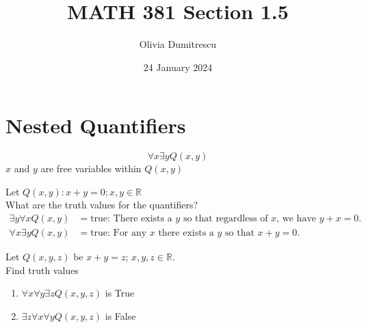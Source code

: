\documentclass[a4paper, 12pt]{article}
\title{MATH 381 Section 1.5}
\author{Olivia Dumitrescu}
\date{24 January 2024}
\newenvironment{example}[1][Example]{\begin{trivlist}
\item[\hskip \labelsep {\bfseries #1}]}{\end{trivlist}}
\begin{document}
    \maketitle
    \section*{Nested Quantifiers}
    \[\forall x \exists y Q(x, y)\]
    $x$ and $y$ are free variables within $Q(x, y)$
    \begin{example}
        Let $Q(x, y): x + y = 0; x, y \in \mathbb{R}$\\
        What are the truth values for the quantifiers?
        \begin{align*}
            \exists y \forall x Q(x, y) &= \text{true: }
            \text{There exists a $y$ so that regardless of $x$, we have $y + x = 0$.}\\
            \forall x \exists y Q(x, y) &= \text{true: }
            \text{For any $x$ there exists a $y$ so that $x + y = 0$.}
        \end{align*}
    \end{example}
    \begin{example}
        Let $Q(x, y, z)$ be $x + y = z$; $x, y, z \in \mathbb{R}$.\\
        Find truth values
        \begin{enumerate}
            \item $\forall x \forall y \exists z Q(x, y, z)$ is True
            \item $\exists z \forall x \forall y Q(x, y, z)$ is False
        \end{enumerate}
    \end{example}
\end{document}
